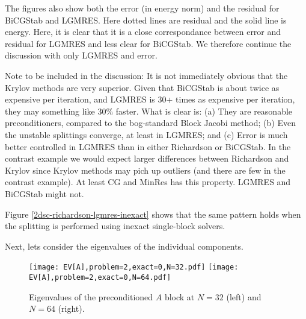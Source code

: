 \documentclass{article}
\begin{document}

The figures also show both the error (in energy norm) and the residual for BiCGStab and LGMRES. 
Here dotted lines are residual and the solid line is energy. Here, it is clear that it is a
close correspondance between error and residual for LGMRES and less clear for BiCGStab. We therefore
continue the discussion with only LGMRES and error. 


Note to be included in the discussion: 
It is not immediately obvious that the Krylov methods are very
superior. Given that BiCGStab is about twice as expensive per iteration, and
LGMRES is 30+ times as expensive per iteration, they may something like 30\%
faster. What is clear is: (a) They are reasonable preconditioners, compared
to the bog-standard Block Jacobi method; (b) Even the unstable splittings
converge, at least in LGMRES; and (c) Error is much better controlled in
LGMRES than in either Richardson or BiCGStab. In the contrast example
we would expect larger differences between Richardson and Krylov since Krylov
methods may pich up outliers (and there are few in the contrast example). 
At least CG and MinRes has this property. LGMRES and BiCGStab might not. 

Figure \ref{2dsc-richardson-lgmres-inexact} shows that the same pattern holds
when the splitting is performed using inexact single-block solvers.

Next, lets consider the eigenvalues of the individual components. 
\begin{figure}
\begin{center}
\texttt{[image: EV[A],problem=2,exact=0,N=32.pdf]}
\texttt{[image: EV[A],problem=2,exact=0,N=64.pdf]}
\caption{Eigenvalues of the preconditioned $A$ block at $N=32$ (left) and $N=64$ (right).}
\label{evA}
\end{center}
\end{figure}
\end{document}
